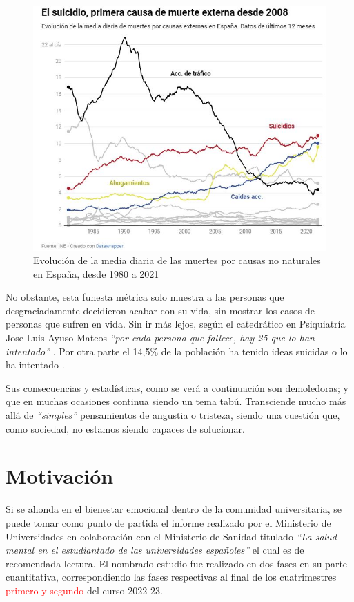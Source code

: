     \begin{figure}[h]
        \centering
        \includegraphics[width=0.85\linewidth]{figures/causas no naturales.jpg}
        \caption[Evolución de la media diaria de las muertes por causas no naturales en España, desde 1980 a 2021]{Evolución de la media diaria de las muertes por causas no naturales en España, desde 1980 a 2021 \cite{sanchez_once_2023}}
        \label{fig:intro:causas_no_naturales}
    \end{figure}

     No obstante, esta funesta métrica solo muestra a las personas que desgraciadamente decidieron acabar con su vida, sin mostrar los casos de personas que sufren en vida. Sin ir más lejos, según el catedrático en Psiquiatría Jose Luis Ayuso Mateos \textit{``por cada persona que fallece, hay 25 que lo han intentado''}  \cite{sanchez_once_2023}.  Por otra parte el 14,5\% de la población ha tenido ideas suicidas o lo ha intentado \cite{comunicacion_cuatro_2023}.

    Sus consecuencias y estadísticas, como se verá a continuación son demoledoras; y que en muchas ocasiones continua siendo un tema tabú. Transciende mucho más allá de \textit{``simples''} pensamientos de angustia o tristeza, siendo una cuestión que, como sociedad, no estamos siendo capaces de solucionar.
    
\section{Motivación}

    Si se ahonda en el bienestar emocional dentro de la comunidad universitaria, se puede tomar como punto de partida el informe realizado por el Ministerio de Universidades en colaboración con el Ministerio de Sanidad titulado \textit{``La salud mental en el estudiantado de las universidades españoles''} \cite{galache_gobierno_2023} \cite{ministerio_de_universidades_salud_2023} el cual es de recomendada lectura. El nombrado estudio fue realizado en dos fases en su parte cuantitativa, correspondiendo las fases respectivas al final de los cuatrimestres \textcolor{red}{primero y segundo} %
    del curso 2022-23. 
    
